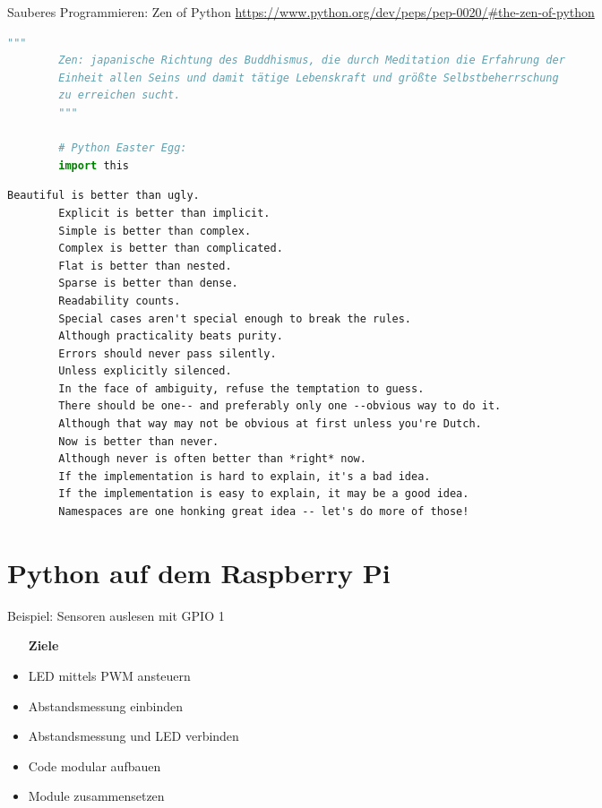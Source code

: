 \begin{frame}[fragile]{Sauberes Programmieren: Zen of Python}
    \url{https://www.python.org/dev/peps/pep-0020/#the-zen-of-python}

    \begin{lstlisting}[language=Python, gobble=8]
        """
        Zen: japanische Richtung des Buddhismus, die durch Meditation die Erfahrung der
        Einheit allen Seins und damit tätige Lebenskraft und größte Selbstbeherrschung
        zu erreichen sucht.
        """

        # Python Easter Egg:
        import this
    \end{lstlisting}

    \begin{Verbatim}[fontsize=\scriptsize, gobble=8]
        Beautiful is better than ugly.
        Explicit is better than implicit.
        Simple is better than complex.
        Complex is better than complicated.
        Flat is better than nested.
        Sparse is better than dense.
        Readability counts.
        Special cases aren't special enough to break the rules.
        Although practicality beats purity.
        Errors should never pass silently.
        Unless explicitly silenced.
        In the face of ambiguity, refuse the temptation to guess.
        There should be one-- and preferably only one --obvious way to do it.
        Although that way may not be obvious at first unless you're Dutch.
        Now is better than never.
        Although never is often better than *right* now.
        If the implementation is hard to explain, it's a bad idea.
        If the implementation is easy to explain, it may be a good idea.
        Namespaces are one honking great idea -- let's do more of those!
    \end{Verbatim}
\end{frame}


\section{Python auf dem Raspberry Pi}

\begin{frame}{Beispiel: Sensoren auslesen mit GPIO 1}
    \begin{itemize}
    \setlength{\itemindent}{.4in}
     \item [\textbf{ Ziele}]
    \end{itemize}
    \begin{itemize}
        \item  LED mittels PWM ansteuern
        \item  Abstandsmessung einbinden
        \item  Abstandsmessung und LED verbinden
        \item  Code modular aufbauen
        \item  Module zusammensetzen
     \end{itemize}
\end{frame}

